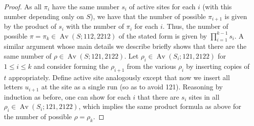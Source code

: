 \documentclass[11pt]{amsart}
\theoremstyle{plain}
\theoremstyle{definition}
\DeclareMathOperator{\Av}{Av}
\begin{document}
\begin{proof}
As all $\pi_i$ have the same number $s_i$ of active sites for each $i$ (with this number depending
only on $S$), we have that the number of possible $\pi_{i+1}$ is given by the product of $s_i$
with the number of $\pi_i$ for each $i$.  Thus, the number of possible $\pi=\pi_k \in
\Av(S;112,2212)$ of the stated form is given by $\prod_{i=1}^{k-1}s_i$.  A similar argument whose
main details we describe briefly shows that there are the same number of $\rho \in \Av(S;121,2122)$.
  Let $\rho_i\in \Av(S_i;121,2122)$ for $1\leq i \leq k$ and consider forming the $\rho_{i+1}$
from the various $\rho_i$ by inserting copies of $t$ appropriately.  Define active site analogously
except that now we insert all letters $u_{i+1}$ at the site as a single run (so as to avoid 121).
Reasoning by induction as before, one can show for each $i$ that there are $s_i$ sites in all
$\rho_i\in \Av(S_i;121,2122)$, which implies the same product formula as above for the number of
possible $\rho=\rho_k$.
\end{proof}
\end{document}
